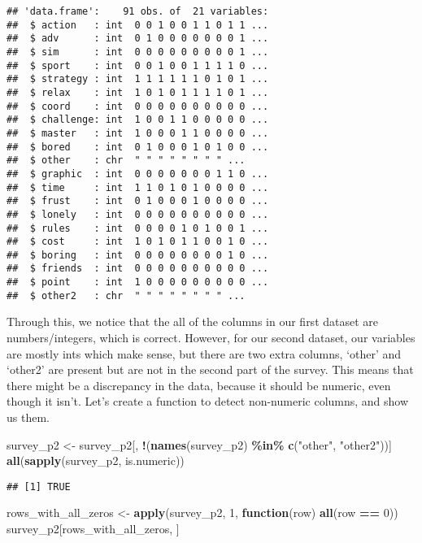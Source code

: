 \documentclass[
]{article}
\newenvironment{Shaded}{\begin{snugshade}}{\end{snugshade}}
\newcommand{\ControlFlowTok}[1]{\textcolor[rgb]{0.13,0.29,0.53}{\textbf{#1}}}
\newcommand{\DecValTok}[1]{\textcolor[rgb]{0.00,0.00,0.81}{#1}}
\newcommand{\FunctionTok}[1]{\textcolor[rgb]{0.13,0.29,0.53}{\textbf{#1}}}
\newcommand{\NormalTok}[1]{#1}
\newcommand{\OtherTok}[1]{\textcolor[rgb]{0.56,0.35,0.01}{#1}}
\newcommand{\SpecialCharTok}[1]{\textcolor[rgb]{0.81,0.36,0.00}{\textbf{#1}}}
\newcommand{\StringTok}[1]{\textcolor[rgb]{0.31,0.60,0.02}{#1}}
\begin{document}
\begin{verbatim}
## 'data.frame':    91 obs. of  21 variables:
##  $ action   : int  0 0 1 0 0 1 1 0 1 1 ...
##  $ adv      : int  0 1 0 0 0 0 0 0 0 1 ...
##  $ sim      : int  0 0 0 0 0 0 0 0 0 1 ...
##  $ sport    : int  0 0 1 0 0 1 1 1 1 0 ...
##  $ strategy : int  1 1 1 1 1 1 0 1 0 1 ...
##  $ relax    : int  1 0 1 0 1 1 1 1 0 1 ...
##  $ coord    : int  0 0 0 0 0 0 0 0 0 0 ...
##  $ challenge: int  1 0 0 1 1 0 0 0 0 0 ...
##  $ master   : int  1 0 0 0 1 1 0 0 0 0 ...
##  $ bored    : int  0 1 0 0 0 1 0 1 0 0 ...
##  $ other    : chr  " " " " " " " " ...
##  $ graphic  : int  0 0 0 0 0 0 0 1 1 0 ...
##  $ time     : int  1 1 0 1 0 1 0 0 0 0 ...
##  $ frust    : int  0 1 0 0 0 1 0 0 0 0 ...
##  $ lonely   : int  0 0 0 0 0 0 0 0 0 0 ...
##  $ rules    : int  0 0 0 0 1 0 1 0 0 1 ...
##  $ cost     : int  1 0 1 0 1 1 0 0 1 0 ...
##  $ boring   : int  0 0 0 0 0 0 0 0 1 0 ...
##  $ friends  : int  0 0 0 0 0 0 0 0 0 0 ...
##  $ point    : int  1 0 0 0 0 0 0 0 0 0 ...
##  $ other2   : chr  " " " " " " " " ...
\end{verbatim}

Through this, we notice that the all of the columns in our first dataset
are numbers/integers, which is correct. However, for our second dataset,
our variables are mostly ints which make sense, but there are two extra
columns, `other' and `other2' are present but are not in the second part
of the survey. This means that there might be a discrepancy in the data,
because it should be numeric, even though it isn't. Let's create a
function to detect non-numeric columns, and show us them.

\begin{Shaded}
\begin{Highlighting}[]
\NormalTok{survey\_p2 }\OtherTok{\textless{}{-}}\NormalTok{ survey\_p2[, }\SpecialCharTok{!}\NormalTok{(}\FunctionTok{names}\NormalTok{(survey\_p2) }\SpecialCharTok{\%in\%} \FunctionTok{c}\NormalTok{(}\StringTok{"other"}\NormalTok{, }\StringTok{"other2"}\NormalTok{))]}
\FunctionTok{all}\NormalTok{(}\FunctionTok{sapply}\NormalTok{(survey\_p2, is.numeric))}
\end{Highlighting}
\end{Shaded}

\begin{verbatim}
## [1] TRUE
\end{verbatim}

\begin{Shaded}
\begin{Highlighting}[]
\NormalTok{rows\_with\_all\_zeros }\OtherTok{\textless{}{-}} \FunctionTok{apply}\NormalTok{(survey\_p2, }\DecValTok{1}\NormalTok{, }\ControlFlowTok{function}\NormalTok{(row) }\FunctionTok{all}\NormalTok{(row }\SpecialCharTok{==} \DecValTok{0}\NormalTok{))}
\NormalTok{survey\_p2[rows\_with\_all\_zeros, ]}
\end{Highlighting}
\end{Shaded}
\end{document}
